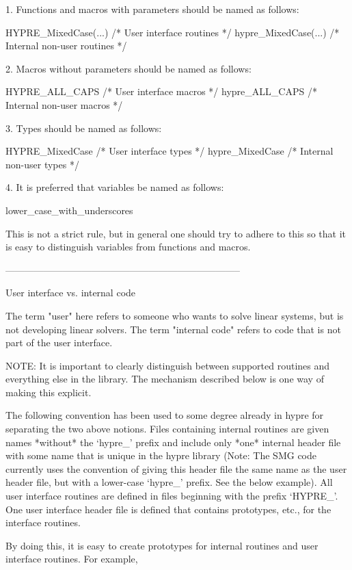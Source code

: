  1. Functions and macros with parameters should be named as follows:

      HYPRE_MixedCase(...)          /* User interface routines */
      hypre_MixedCase(...)          /* Internal non-user routines */

 2. Macros without parameters should be named as follows:

      HYPRE_ALL_CAPS          /* User interface macros */
      hypre_ALL_CAPS          /* Internal non-user macros */

 3. Types should be named as follows:

      HYPRE_MixedCase          /* User interface types */
      hypre_MixedCase          /* Internal non-user types */

 4. It is preferred that variables be named as follows:

      lower_case_with_underscores

    This is not a strict rule, but in general one should try
    to adhere to this so that it is easy to distinguish variables
    from functions and macros.
 
--------------------------------------------------------------------------

User interface vs. internal code

The term "user" here refers to someone who wants to solve linear systems,
but is not developing linear solvers.  The term "internal code" refers to
code that is not part of the user interface.

NOTE: It is important to clearly distinguish between supported
routines and everything else in the library.  The mechanism described
below is one way of making this explicit.

The following convention has been used to some degree already in hypre
for separating the two above notions.  Files containing internal
routines are given names *without* the `hypre_' prefix and include
only *one* internal header file with some name that is unique in the
hypre library (Note: The SMG code currently uses the convention of
giving this header file the same name as the user header file, but
with a lower-case `hypre_' prefix.  See the below example).  All user
interface routines are defined in files beginning with the prefix
`HYPRE_'.  One user interface header file is defined that contains
prototypes, etc., for the interface routines.

By doing this, it is easy to create prototypes for internal routines and
user interface routines.  For example,

